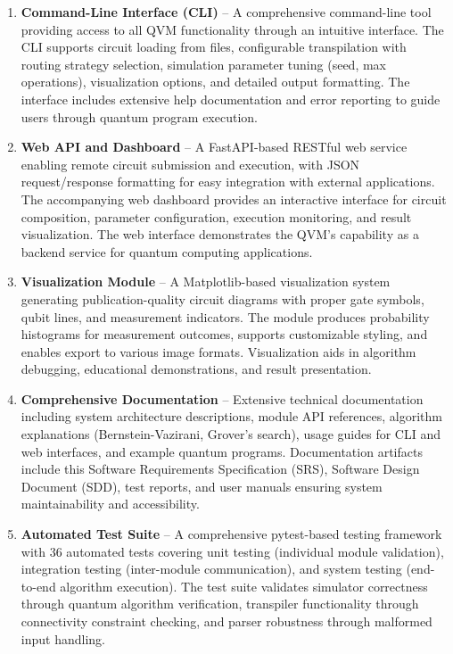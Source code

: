 \begin{enumerate}
    \item \textbf{Command-Line Interface (CLI)} – A comprehensive command-line tool providing access to all QVM functionality through an intuitive interface. The CLI supports circuit loading from files, configurable transpilation with routing strategy selection, simulation parameter tuning (seed, max operations), visualization options, and detailed output formatting. The interface includes extensive help documentation and error reporting to guide users through quantum program execution.

    \item \textbf{Web API and Dashboard} – A FastAPI-based RESTful web service enabling remote circuit submission and execution, with JSON request/response formatting for easy integration with external applications. The accompanying web dashboard provides an interactive interface for circuit composition, parameter configuration, execution monitoring, and result visualization. The web interface demonstrates the QVM's capability as a backend service for quantum computing applications.

    \item \textbf{Visualization Module} – A Matplotlib-based visualization system generating publication-quality circuit diagrams with proper gate symbols, qubit lines, and measurement indicators. The module produces probability histograms for measurement outcomes, supports customizable styling, and enables export to various image formats. Visualization aids in algorithm debugging, educational demonstrations, and result presentation.

    \item \textbf{Comprehensive Documentation} – Extensive technical documentation including system architecture descriptions, module API references, algorithm explanations (Bernstein-Vazirani, Grover's search), usage guides for CLI and web interfaces, and example quantum programs. Documentation artifacts include this Software Requirements Specification (SRS), Software Design Document (SDD), test reports, and user manuals ensuring system maintainability and accessibility.

    \item \textbf{Automated Test Suite} – A comprehensive pytest-based testing framework with 36 automated tests covering unit testing (individual module validation), integration testing (inter-module communication), and system testing (end-to-end algorithm execution). The test suite validates simulator correctness through quantum algorithm verification, transpiler functionality through connectivity constraint checking, and parser robustness through malformed input handling.


\end{enumerate}
